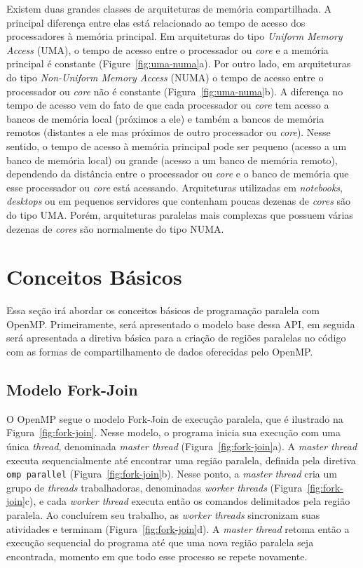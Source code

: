 \documentclass{SBCbookchapter}
\begin{document}
	Existem duas grandes classes de arquiteturas de memória compartilhada. A
	principal diferença entre elas está relacionado ao tempo de acesso dos
	processadores à memória principal. Em arquiteturas do tipo
	\textit{Uniform Memory Access} (UMA), o tempo de acesso entre o
	processador ou \textit{core} e a memória principal é constante (Figure~\ref{fig:uma-numa}a).
	Por outro lado, em arquiteturas do tipo \textit{Non-Uniform Memory Access}
	(NUMA) o tempo de acesso entre o processador ou \textit{core} não é
	constante (Figura~\ref{fig:uma-numa}b). A diferença no tempo de acesso vem
	do fato de que cada processador ou \textit{core} tem acesso a bancos de memória local
	(próximos a ele) e também a bancos de memória remotos (distantes a ele
	mas próximos de outro processador ou \textit{core}). Nesse sentido, o
	tempo de acesso à memória principal pode ser pequeno (acesso a um banco
	de memória local) ou grande (acesso a um banco de memória remoto),
	dependendo da distância entre o processador ou \textit{core} e o banco
	de memória que esse processador ou \textit{core} está acessando.
	Arquiteturas utilizadas em \textit{notebooks}, \textit{desktops} ou em
	pequenos servidores que contenham poucas dezenas de \textit{cores} são
	do tipo UMA. Porém, arquiteturas paralelas mais complexas que possuem
	várias dezenas de \textit{cores} são normalmente do tipo NUMA.

\section{Conceitos Básicos}

	Essa seção irá abordar os conceitos básicos de programação paralela com
	OpenMP. Primeiramente, será apresentado o modelo base dessa API, em
	seguida será apresentada a diretiva básica para a criação de regiões
	paralelas no código com as formas de compartilhamento de dados
	oferecidas pelo OpenMP.

	\subsection{Modelo Fork-Join}

		O OpenMP segue o modelo Fork-Join de execução paralela, que é
		ilustrado na Figura~\ref{fig:fork-join}. Nesse modelo, o programa inicia sua
		execução com uma única \textit{thread}, denominada \textit{master thread}
		(Figura~\ref{fig:fork-join}a). A \textit{master thread} executa sequencialmente até
		encontrar uma região paralela, definida pela diretiva \texttt{omp parallel}
		(Figura~\ref{fig:fork-join}b). Nesse ponto, a \textit{master thread} cria um grupo
		de \textit{threads} trabalhadoras, denominadas \textit{worker threads}
		(Figura~\ref{fig:fork-join}c), e cada \textit{worker thread} executa então os
		comandos delimitados pela região paralela. Ao concluírem seu
		trabalho, as \textit{worker threads} sincronizam suas atividades e
		terminam (Figura~\ref{fig:fork-join}d). A \textit{master thread} retoma então a
		execução sequencial do programa até que uma nova região paralela
		seja encontrada, momento em que todo esse processo se repete
		novamente.
		
\end{document}
